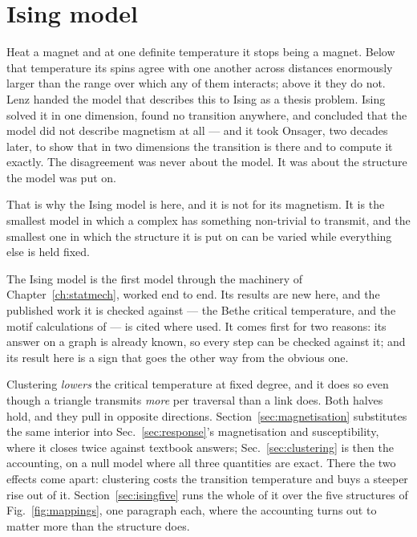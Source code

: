 \chapter{Ising model}
\label{ch:ising}

Heat a magnet and at one definite temperature it stops being a magnet. Below
that temperature its spins agree with one another across distances enormously
larger than the range over which any of them interacts; above it they do not.
Lenz handed the model that describes this to Ising as a thesis problem. Ising
solved it in one dimension, found no transition anywhere, and concluded that the
model did not describe magnetism at all --- and it took Onsager, two decades
later, to show that in two dimensions the transition is there and to compute it
exactly. The disagreement was never about the model. It was about the structure
the model was put on.

That is why the Ising model is here, and it is not for its magnetism. It is the
smallest model in which a complex has something non-trivial to transmit, and the
smallest one in which the structure it is put on can be varied while everything
else is held fixed.

The Ising model is the first model through the machinery of
Chapter~\ref{ch:statmech}, worked end to end. Its results are new here, and
the published work it is checked against --- the Bethe critical temperature, and
the motif calculations of \citet{yoon2011} --- is cited where used. It comes first for two reasons:
its answer on a graph is already known, so every step can be checked against it;
and its result here is a sign that goes the other way from the obvious one.

Clustering \emph{lowers} the critical temperature at fixed degree, and it does
so even though a triangle transmits \emph{more} per traversal than a link does.
Both halves hold, and they pull in opposite directions.
Section~\ref{sec:magnetisation} substitutes the same interior into
Sec.~\ref{sec:response}'s magnetisation and susceptibility, where it closes
twice against textbook answers; Sec.~\ref{sec:clustering} is then the
accounting, on a null model where all three quantities are exact. There the two effects come apart: clustering
costs the transition temperature and buys a steeper rise out of it.
Section~\ref{sec:isingfive} runs the whole of it over the five structures of
Fig.~\ref{fig:mappings}, one paragraph each, where the accounting turns out to
matter more than the structure does.

